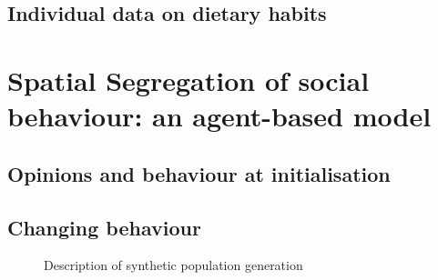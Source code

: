 \documentclass[11pt]{article}
\begin{document}
\subsection{Individual data on dietary habits}


\section{Spatial Segregation of social behaviour: an agent-based model}

\subsection{Opinions and behaviour at initialisation}

\subsection {Changing behaviour}


\begin{figure}[htbp] \begin{center} 
 \caption{Description of synthetic population generation} \label{fig:synthetic} \end{center} \end{figure} %
\end{document}
